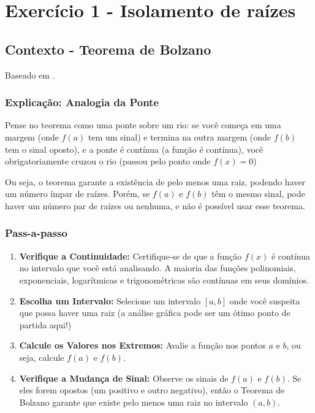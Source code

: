 \documentclass{article}
\begin{document}
\section{Exercício 1 - Isolamento de raízes}

\subsection{Contexto - Teorema de Bolzano}
    Baseado em \cite{brasilead2026}.
    \subsubsection{Explicação: Analogia da Ponte}
        Pense no teorema como uma ponte sobre um rio: se você começa em uma margem (onde $f(a)$ tem um sinal) e termina na outra margem (onde $f(b)$ tem o sinal oposto), e a ponte é contínua (a função é contínua), você obrigatoriamente cruzou o rio (passou pelo ponto onde $f(x) = 0$)

        Ou seja, o teorema garante a existência de pelo menos uma raiz, podendo haver um número ímpar de raízes. Porém, se $f(a)$ e $f(b)$ têm o mesmo sinal, pode haver um número par de raízes ou nenhuma, e não é possível usar esse teorema.

    \subsubsection{Pass-a-passo}
        \begin{enumerate}
            \item \textbf{Verifique a Continuidade:} Certifique-se de que a função $f(x)$ é contí\-nua no intervalo que você está analisando. A maioria das funções polinomiais, exponenciais, logarítmicas e trigonométricas são contínuas em seus domínios.
            \item \textbf{Escolha um Intervalo:} Selecione um intervalo $[a,b]$ onde você suspeita que possa haver uma raiz (a análise gráfica pode ser um ótimo ponto de partida aqui!)
            \item \textbf{Calcule os Valores nos Extremos:} Avalie a função nos pontos $a$ e $b$, ou seja, calcule $f(a)$ e $f(b)$.
            \item \textbf{Verifique a Mudança de Sinal:} Observe os sinais de $f(a)$ e $f(b)$. Se eles forem opostos (um positivo e outro negativo), então o Teorema de Bolzano garante que existe pelo menos uma raiz no intervalo $(a,b)$.
        \end{enumerate}  
\end{document}
